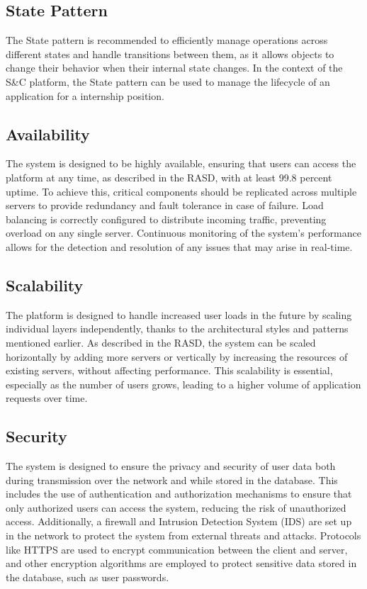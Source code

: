 \subsection{State Pattern}\label{subsec:state pattern}
The State pattern is recommended to efficiently manage operations across different states and handle transitions between them, as it allows objects to change their behavior 
when their internal state changes. In the context of the S\&C platform, the State pattern can be used to manage the lifecycle of an application for a internship position.

\subsection{Availability}\label{subsec:availability}
The system is designed to be highly available, ensuring that users can access the platform at any time, as described in the RASD, with at least 99.8 percent uptime. 
To achieve this, critical components should be replicated across multiple servers to provide redundancy and fault tolerance in case of failure. Load balancing is 
correctly configured to distribute incoming traffic, preventing overload on any single server. Continuous monitoring of the system's performance allows for the 
detection and resolution of any issues that may arise in real-time.
\subsection{Scalability}\label{subsec:scalability}
The platform is designed to handle increased user loads in the future by scaling individual layers independently, thanks to the architectural styles and patterns 
mentioned earlier. As described in the RASD, the system can be scaled horizontally by adding more servers or vertically by increasing the resources of existing 
servers, without affecting performance. This scalability is essential, especially as the number of users grows, leading to a higher volume of application requests 
over time.
\subsection{Security}\label{subsec:security}
The system is designed to ensure the privacy and security of user data both during transmission over the network and while stored in the database. This includes the 
use of authentication and authorization mechanisms to ensure that only authorized users can access the system, reducing the risk of unauthorized access. Additionally, 
a firewall and Intrusion Detection System (IDS) are set up in the network to protect the system from external threats and attacks. Protocols like HTTPS are used to 
encrypt communication between the client and server, and other encryption algorithms are employed to protect sensitive data stored in the database, such as user 
passwords.


